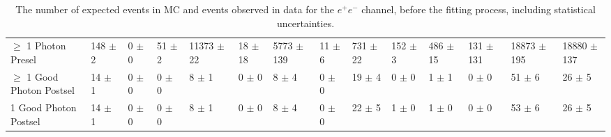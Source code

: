 \begin{table}
{\begin{tabular}{|l|l|l|l|l|l|l|l|l|l|l|l|l|l|}
$\geq$ 1 Photon Presel & 148 $\pm$ 2 \ & 0 $\pm$ 0 \ & 51 $\pm$ 2 \ & 11373 $\pm$ 22 \ & 18 $\pm$ 18 \ & 5773 $\pm$ 139 \ & 11 $\pm$ 6 \ & 731 $\pm$ 22 \ & 152 $\pm$ 3 \ & 486 $\pm$ 15 \ & 131 $\pm$ 131\ & 18873 $\pm$ 195 \ & 18880 $\pm$ 137 \\
$\geq$ 1 Good Photon Postsel & 14 $\pm$ 1 \ & 0 $\pm$ 0 \ & 0 $\pm$ 0 \ & 8 $\pm$ 1 \ & 0 $\pm$ 0 \ & 8 $\pm$ 4 \ & 0 $\pm$ 0 \ & 19 $\pm$ 4 \ & 0 $\pm$ 0 \ & 1 $\pm$ 1 \ & 0 $\pm$ 0\ & 51 $\pm$ 6 \ & 26 $\pm$ 5 \\
1 Good Photon Postsel & 14 $\pm$ 1 \ & 0 $\pm$ 0 \ & 0 $\pm$ 0 \ & 8 $\pm$ 1 \ & 0 $\pm$ 0 \ & 8 $\pm$ 4 \ & 0 $\pm$ 0 \ & 22 $\pm$ 5 \ & 1 $\pm$ 0 \ & 1 $\pm$ 0 \ & 0 $\pm$ 0\ & 53 $\pm$ 6 \ & 26 $\pm$ 5 \\


\hline
\end{tabular}
}
\caption{The number of expected events in MC and events observed in data for the $e^+e^-$ channel, before the fitting process, including statistical uncertainties.}
\label{tab-cutflowEE}
\end{table}

